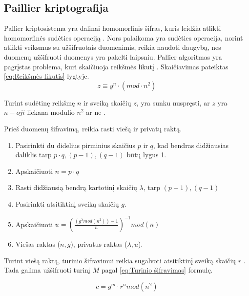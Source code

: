 \documentclass{VUMIFInfBakalaurinis}
\begin{document}
\subsection{Paillier kriptografija}
\par Pallier kriptosistema yra dalinai homomorfinis šifras, kuris leidžia atlikti homomorfinės sudėties operaciją \cite{17}. Nors palaikoma yra sudėties operacija, norint atlikti veiksmus su užšifruotais duomenimis, reikia naudoti daugybą, nes duomenų užšifruoti duomenys yra pakelti laipsniu. Pallier algoritmas yra pagrįstas problema, kuri skaičiuoja reikšmės likutį \cite{17}. Skaičiavimas pateiktas \eqref{eq:Reikšmės likutis} lygtyje.
\begin{equation}
    z \equiv y^{n} \cdot (mod\cdot n^{2})
    \label{eq:Reikšmės likutis}
\end{equation}
\par Turint sudėtinę reikšmę $n$ ir sveiką skaičių $z$, yra sunku nuspręsti, ar $z$ yra $n-oji$ liekana modulio $n^{2}$ ar ne \cite{17}.
\par Prieš duomenų šifravimą, reikia rasti viešą ir privatų raktą.

\begin{enumerate}
    \item Pasirinkti du didelius pirminius skaičius $p$ ir $q$, kad bendras didžiausias daliklis tarp $p \cdot q, (p - 1), (q - 1)$ būtų lygus 1.
    \item Apskaičiuoti $n = p \cdot q$
    \item Rasti didžiausią bendrą kartotinį skaičių $\lambda$, tarp $(p - 1), (q - 1)$
    \item Pasirinkti atsitiktinį sveiką skaičių $g$.
    \item Apskaičiuoti $u = (\frac{(g^{\lambda} mod (n^2)) - 1}{n})^{-1} mod (n)$
    \item Viešas raktas ($n, g$), privatus raktas ($\lambda, u$).
\end{enumerate}

\par Turint viešą raktą, turinio šifravimui reikia sugalvoti atsitiktinį sveiką skaičių $r$ \cite{17}. Tada galima užšifruoti turinį $M$ pagal \eqref{eq:Turinio šifravimas} formulę.

\begin{equation}
    c = g^{m} \cdot r^{n} mod(n^{2})
    \label{eq:Turinio šifravimas}
\end{equation}
\end{document}
